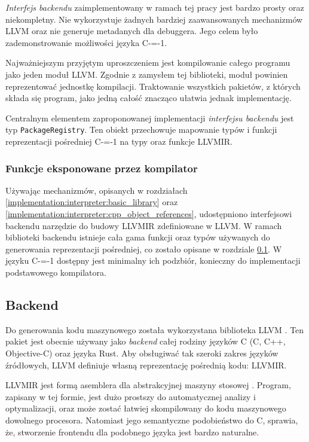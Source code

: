 \emph{Interfejs backendu} zaimplementowany w ramach tej pracy jest bardzo prosty oraz niekompletny.
Nie wykorzystuje żadnych bardziej zaawansowanych mechanizmów LLVM oraz nie generuje metadanych dla debuggera.
Jego celem było zademonstrowanie możliwości języka C-=-1.

Najważniejszym przyjętym uproszczeniem jest kompilowanie całego programu jako jeden moduł LLVM.
Zgodnie z zamysłem tej biblioteki, moduł powinien reprezentować jednostkę kompilacji.
Traktowanie wszystkich pakietów, z których składa się program, jako jedną całość znacząco ułatwia jednak implementację.

Centralnym elementem zaproponowanej implementacji \emph{interfejsu backendu} jest typ \lstinline{PackageRegistry}.
Ten obiekt przechowuje mapowanie typów i funkcji reprezentacji pośredniej C-=-1 na typy oraz funkcje LLVMIR.
\subsubsection{Funkcje eksponowane przez kompilator}

Używając mechanizmów, opisanych w rozdziałach \ref{implementation:interpreter:basic_library} oraz \ref{implementation:interpreter:cpp_object_references}, udostępniono interfejsowi backendu narzędzie do budowy LLVMIR zdefiniowane w LLVM.
W ramach biblioteki backendu istnieje cała gama funkcji oraz typów używanych do generowania reprezentacji pośredniej, co zostało opisane w rozdziale \ref{implementation:backend}.
W języku C-=-1 dostępny jest minimalny ich podzbiór, konieczny do implementacji podstawowego kompilatora.



\subsection{Backend}
\label{implementation:backend}
Do generowania kodu maszynowego została wykorzystana biblioteka LLVM \cite{Lattner:MSThesis02}.
Ten pakiet jest obecnie używany jako \emph{backend} całej rodziny języków C (C, C++, Objective-C) oraz języka Rust.
Aby obsługiwać tak szeroki zakres języków źródłowych, LLVM definiuje własną reprezentację pośrednią kodu: LLVMIR.

LLVMIR jest formą asemblera dla abstrakcyjnej maszyny stosowej \cite{llvmir}.
Program, zapisany w tej formie, jest dużo prostszy do automatycznej analizy i optymalizacji, oraz może zostać łatwiej skompilowany do kodu maszynowego dowolnego procesora.
Natomiast jego semantyczne podobieństwo do C, sprawia, że, stworzenie frontendu dla podobnego języka jest bardzo naturalne.

